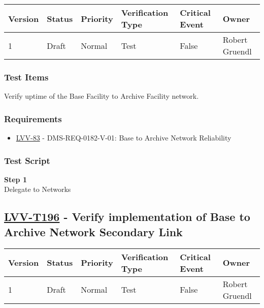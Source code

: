 \begin{longtable}[]{@{}llllll@{}}
\toprule
Version & Status & Priority & Verification Type & Critical Event &
Owner\tabularnewline
\midrule
\endhead
1 & Draft & Normal & Test & False & Robert Gruendl\tabularnewline
\bottomrule
\end{longtable}

\subsubsection{Test Items}\label{test-items-54}

Verify uptime of the Base Facility to Archive Facility network.

\subsubsection{Requirements}\label{requirements-54}

\begin{itemize}
\tightlist
\item
  \href{https://jira.lsstcorp.org/browse/LVV-83}{LVV-83} -
  DMS-REQ-0182-V-01: Base to Archive Network Reliability
\end{itemize}

\subsubsection{Test Script}\label{test-script-54}

\textbf{Step 1}\\
Delegate to Networks\\[2\baselineskip]

\hypertarget{lvv-t196---verify-implementation-of-base-to-archive-network-secondary-link}{\subsection{\texorpdfstring{\href{https://jira.lsstcorp.org/secure/Tests.jspa\#/testCase/LVV-T196}{LVV-T196}
- Verify implementation of Base to Archive Network Secondary
Link}{LVV-T196 - Verify implementation of Base to Archive Network Secondary Link}}\label{lvv-t196---verify-implementation-of-base-to-archive-network-secondary-link}}

\begin{longtable}[]{@{}llllll@{}}
\toprule
Version & Status & Priority & Verification Type & Critical Event &
Owner\tabularnewline
\midrule
\endhead
1 & Draft & Normal & Test & False & Robert Gruendl\tabularnewline
\bottomrule
\end{longtable}

